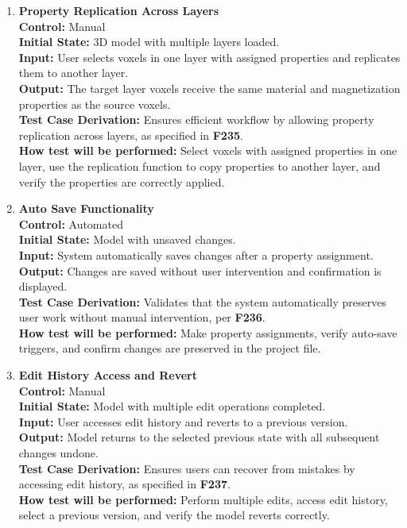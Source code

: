 \documentclass[12pt, titlepage]{article}
\begin{document}
\begin{enumerate}
  \item \textbf{Property Replication Across Layers} \\[2mm]
    \textbf{Control:} Manual \\ 
    \textbf{Initial State:} 3D model with multiple layers loaded. \\ 
    \textbf{Input:} User selects voxels in one layer with assigned properties and replicates them to another layer. \\ 
    \textbf{Output:} The target layer voxels receive the same material and magnetization properties as the source voxels. \\[2mm]
    \textbf{Test Case Derivation:} Ensures efficient workflow by allowing property replication across layers, as specified in \textbf{F235}. \\[2mm]
    \textbf{How test will be performed:} Select voxels with assigned properties in one layer, use the replication function to copy properties to another layer, and verify the properties are correctly applied.

  \item \textbf{Auto Save Functionality} \\[2mm]
    \textbf{Control:} Automated \\ 
    \textbf{Initial State:} Model with unsaved changes. \\ 
    \textbf{Input:} System automatically saves changes after a property assignment. \\ 
    \textbf{Output:} Changes are saved without user intervention and confirmation is displayed. \\[2mm]
    \textbf{Test Case Derivation:} Validates that the system automatically preserves user work without manual intervention, per \textbf{F236}. \\[2mm]
    \textbf{How test will be performed:} Make property assignments, verify auto-save triggers, and confirm changes are preserved in the project file.

  \item \textbf{Edit History Access and Revert} \\[2mm]
    \textbf{Control:} Manual \\ 
    \textbf{Initial State:} Model with multiple edit operations completed. \\ 
    \textbf{Input:} User accesses edit history and reverts to a previous version. \\ 
    \textbf{Output:} Model returns to the selected previous state with all subsequent changes undone. \\[2mm]
    \textbf{Test Case Derivation:} Ensures users can recover from mistakes by accessing edit history, as specified in \textbf{F237}. \\[2mm]
    \textbf{How test will be performed:} Perform multiple edits, access edit history, select a previous version, and verify the model reverts correctly.


\end{enumerate}
\end{document}
